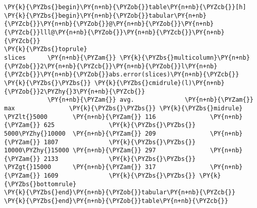 \begin{Verbatim}[commandchars=\\\{\}]
\PY{k}{\PYZbs{}begin}\PY{n+nb}{\PYZob{}}table\PY{n+nb}{\PYZcb{}}[h]
\PY{k}{\PYZbs{}begin}\PY{n+nb}{\PYZob{}}tabular\PY{n+nb}{\PYZcb{}}\PY{n+nb}{\PYZob{}}@\PY{n+nb}{\PYZob{}}\PY{n+nb}{\PYZcb{}}lll@\PY{n+nb}{\PYZob{}}\PY{n+nb}{\PYZcb{}}\PY{n+nb}{\PYZcb{}}
\PY{k}{\PYZbs{}toprule}
slices      \PY{n+nb}{\PYZam{}} \PY{k}{\PYZbs{}multicolumn}\PY{n+nb}{\PYZob{}}2\PY{n+nb}{\PYZcb{}}\PY{n+nb}{\PYZob{}}l\PY{n+nb}{\PYZcb{}}\PY{n+nb}{\PYZob{}}abs.error(slices)\PY{n+nb}{\PYZcb{}} \PY{k}{\PYZbs{}\PYZbs{}} \PY{k}{\PYZbs{}cmidrule}(l)\PY{n+nb}{\PYZob{}}2\PYZhy{}3\PY{n+nb}{\PYZcb{}}
            \PY{n+nb}{\PYZam{}} avg.              \PY{n+nb}{\PYZam{}} max               \PY{k}{\PYZbs{}\PYZbs{}} \PY{k}{\PYZbs{}midrule}
\PYZlt{}5000       \PY{n+nb}{\PYZam{}} 116               \PY{n+nb}{\PYZam{}} 625               \PY{k}{\PYZbs{}\PYZbs{}}
5000\PYZhy{}10000  \PY{n+nb}{\PYZam{}} 209               \PY{n+nb}{\PYZam{}} 1807              \PY{k}{\PYZbs{}\PYZbs{}}
10000\PYZhy{}15000 \PY{n+nb}{\PYZam{}} 297               \PY{n+nb}{\PYZam{}} 2133              \PY{k}{\PYZbs{}\PYZbs{}}
\PYZgt{}15000      \PY{n+nb}{\PYZam{}} 317               \PY{n+nb}{\PYZam{}} 1609              \PY{k}{\PYZbs{}\PYZbs{}} \PY{k}{\PYZbs{}bottomrule}
\PY{k}{\PYZbs{}end}\PY{n+nb}{\PYZob{}}tabular\PY{n+nb}{\PYZcb{}}
\PY{k}{\PYZbs{}end}\PY{n+nb}{\PYZob{}}table\PY{n+nb}{\PYZcb{}}
\end{Verbatim}
